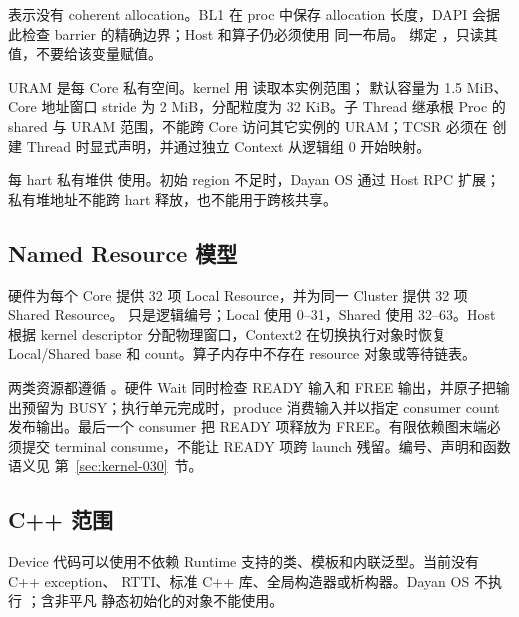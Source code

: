 \documentclass[../dayan_kernel_manual.tex]{subfiles}
\begin{document}
 表示没有 coherent allocation。BL1 在 proc 中保存 allocation
长度，DAPI 会据此检查 barrier 的精确边界；Host 和算子仍必须使用
同一布局。 绑定 ，只读其值，不要给该变量赋值。

URAM 是每 Core 私有空间。kernel 用  读取本实例范围；
默认容量为 1.5 MiB、Core 地址窗口 stride 为 2 MiB，分配粒度为 32 KiB。子 Thread
继承根 Proc 的 shared 与 URAM 范围，不能跨 Core 访问其它实例的 URAM；TCSR 必须在
创建 Thread 时显式声明，并通过独立 Context 从逻辑组 0 开始映射。

每 hart 私有堆供  使用。初始 region 不足时，Dayan OS 通过 Host RPC
扩展；私有堆地址不能跨 hart 释放，也不能用于跨核共享。

\subsection{Named Resource 模型}

硬件为每个 Core 提供 32 项 Local Resource，并为同一 Cluster 提供 32 项 Shared
Resource。 只是逻辑编号；Local 使用 0--31，Shared 使用
32--63。Host 根据 kernel descriptor 分配物理窗口，Context2 在切换执行对象时恢复
Local/Shared base 和 count。算子内存中不存在 resource 对象或等待链表。

两类资源都遵循 。硬件 Wait 同时检查 READY 输入和
FREE 输出，并原子把输出预留为 BUSY；执行单元完成时，produce 消费输入并以指定 consumer
count 发布输出。最后一个 consumer 把 READY 项释放为 FREE。有限依赖图末端必须提交
terminal consume，不能让 READY 项跨 launch 残留。编号、声明和函数语义见
第~\ref{sec:kernel-030}~节。

\subsection{C++ 范围}

Device 代码可以使用不依赖 Runtime 支持的类、模板和内联泛型。当前没有 C++ exception、
RTTI、标准 C++ 库、全局构造器或析构器。Dayan OS 不执行 ；含非平凡
静态初始化的对象不能使用。
\end{document}
